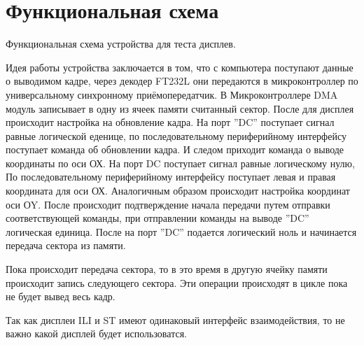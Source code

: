\chapter{Функциональная схема}

	{Функциональная схема устройства для теста дисплев.} %

	Идея работы устройства заключается в том, что с компьютера поступают данные о выводимом кадре, через декодер FT232L они передаются в микроконтроллер по универсальному синхронному приёмопередатчик. В Микроконтроллере DMA модуль записывает в одну из ячеек памяти считанный сектор. После для дисплея происходит настройка на обновление кадра. На порт ''DC'' поступает сигнал равные логической еденице, по последовательному периферийному интерфейсу поступает команда об обновлении кадра. И следом приходит команда о выводе координаты по оси ОХ. На порт DC поступает сигнал равные логическому нулю, По последовательному периферийному интерфейсу поступает левая и правая координата для оси ОХ. Аналогичным образом происходит настройка координат оси ОY. После происходит подтверждение начала передачи путем отправки соответствующей команды, при отправлении команды на выводе ''DC'' логическая единица. После на порт ''DC'' подается логический ноль и начинается передача сектора из памяти. 
	
	Пока происходит передача сектора, то в это время в другую ячейку памяти происходит запись следующего сектора. Эти операции происходят в цикле пока не будет вывед весь кадр.
	
	Так как дисплеи ILI и ST имеют одинаковый интерфейс взаимодействия, то не важно какой дисплей будет использоватся.


	
	
	

